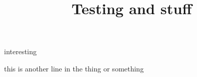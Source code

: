 \documentclass{article}
\title{Testing and stuff}
\begin{document}
  \maketitle
  \newpage
  \noindent
  interesting

  this is another line in the thing or something
\end{document}
